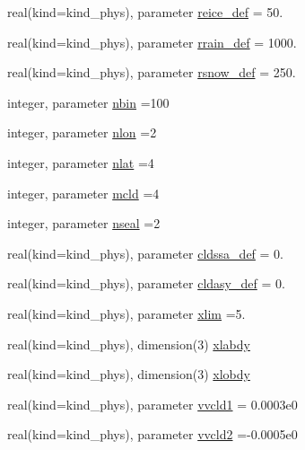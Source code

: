 \begin{DoxyCompactItemize}
\item 
real(kind=kind\+\_\+phys), parameter \hyperlink{group__module__radiation__clouds_ga721e0fb4a34774f5b61f567b9cad8e7b}{reice\+\_\+def} = 50.
\item 
real(kind=kind\+\_\+phys), parameter \hyperlink{group__module__radiation__clouds_ga93fcaedae02c0f9c4de9f39061379d6b}{rrain\+\_\+def} = 1000.
\item 
real(kind=kind\+\_\+phys), parameter \hyperlink{group__module__radiation__clouds_ga2b68c4a206e17cb59597f6c4dffc7c1a}{rsnow\+\_\+def} = 250.
\item 
integer, parameter \hyperlink{group__module__radiation__clouds_gad2947b3c0a8382fbe12b76dd68b290e0}{nbin} =100
\item 
integer, parameter \hyperlink{group__module__radiation__clouds_gab4d14edea12bbcda5361cad523386c7c}{nlon} =2
\item 
integer, parameter \hyperlink{group__module__radiation__clouds_gad4274cb223949e858ecc2e6346bed610}{nlat} =4
\item 
integer, parameter \hyperlink{group__module__radiation__clouds_gafb94f3d62afa49bef6c33f73a7ecad65}{mcld} =4
\item 
integer, parameter \hyperlink{group__module__radiation__clouds_gaaf2a6549a8c42b9eae3d40d21d1e9532}{nseal} =2
\item 
real(kind=kind\+\_\+phys), parameter \hyperlink{group__module__radiation__clouds_ga2ce850be46f0144caa09309ae01958c2}{cldssa\+\_\+def} = 0.
\item 
real(kind=kind\+\_\+phys), parameter \hyperlink{group__module__radiation__clouds_gab94e45a81d8be82b6cb686b35fd78a80}{cldasy\+\_\+def} = 0.
\item 
real(kind=kind\+\_\+phys), parameter \hyperlink{group__module__radiation__clouds_ga1146f43b680b655d354a9c031ee4a463}{xlim} =5.
\item 
real(kind=kind\+\_\+phys), dimension(3) \hyperlink{group__module__radiation__clouds_gab2a798da0bb0125d1d5074b73c5951dc}{xlabdy}
\item 
real(kind=kind\+\_\+phys), dimension(3) \hyperlink{group__module__radiation__clouds_gaab28f783919380e5ff7f925f70355a57}{xlobdy}
\item 
real(kind=kind\+\_\+phys), parameter \hyperlink{group__module__radiation__clouds_ga6ec3c0444de53580befd4bb4d39844d3}{vvcld1} = 0.\+0003e0
\item 
real(kind=kind\+\_\+phys), parameter \hyperlink{group__module__radiation__clouds_ga67962e77fb073cc25cafaaba0c2fa833}{vvcld2} =-\/0.\+0005e0

\end{DoxyCompactItemize}
